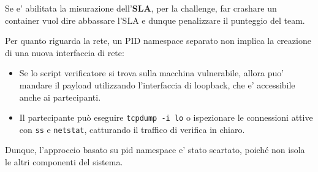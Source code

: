 Se e' abilitata la misurazione dell'\textbf{SLA}, per la challenge, far
crashare un container vuol dire abbassare l'SLA e dunque penalizzare il
punteggio del team.

Per quanto riguarda la rete, un PID namespace separato non implica la
creazione di una nuova interfaccia di rete:

\begin{itemize}
\tightlist
\item
  Se lo script verificatore si trova sulla macchina vulnerabile, allora
  puo' mandare il payload utilizzando l'interfaccia di loopback, che e'
  accessibile anche ai partecipanti.
\item
  Il partecipante può eseguire \passthrough{\lstinline!tcpdump -i lo!} o
  ispezionare le connessioni attive con \passthrough{\lstinline!ss!} e
  \passthrough{\lstinline!netstat!}, catturando il traffico di verifica
  in chiaro.
\end{itemize}

Dunque, l'approccio basato su pid namespace e' stato scartato, poiché
non isola le altri componenti del sistema.
